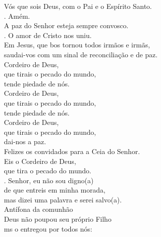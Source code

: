 \documentclass{book}
\begin{document}
\begin{flushleft}
    Vós que sois Deus, com o Pai e o Espírito Santo.
    \vspace{.2cm} \\
    {\color{VioletRed2} \Rbar.} Amém.
    \vspace{.2cm} \\
    A paz do Senhor esteja sempre convosco.
    \vspace{.2cm} \\
    {\color{VioletRed2} \Rbar.} O amor de Cristo nos uniu.
    \vspace{.2cm} \\
    Em Jesus, que bos tornou todos irmãos e irmãs, \\
    saudai-vos com um sinal de reconciliação e de paz.
    \vspace{.2cm} \\
    Cordeiro de Deus, \\
    que tirais o pecado do mundo, \\
    tende piedade de nós. \\
    Cordeiro de Deus, \\
    que tirais o pecado do mundo, \\
    tende piedade de nós. \\
    Cordeiro de Deus, \\
    que tirais o pecado do mundo, \\
    dai-nos a paz.
    \vspace{.2cm} \\
    Felizes os convidados para a Ceia do Senhor.
    \vspace{.2cm} \\
    Eis o Cordeiro de Deus, \\
    que tira o pecado do mundo.
    \vspace{.2cm} \\
    {\color{VioletRed2} \Rbar.} Senhor, eu não sou digno{\color{VioletRed2}(}a{\color{VioletRed2})} \\
    de que entreis em minha morada, \\
    mas dizei uma palavra e serei salvo{\color{VioletRed2}(}a{\color{VioletRed2})}.
    \vspace{.2cm} \\
    \textcolor{VioletRed2}{Antífona da comunhão}
    \vspace{.2cm} \\
    Deus não poupou seu próprio Filho \\
    ms o entregou por todos nós: \\

\end{flushleft}
\end{document}
